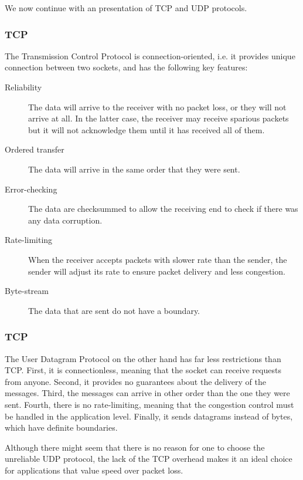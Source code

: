 
We now continue with an presentation of TCP and UDP protocols.

\subsubsection{TCP}

The Transmission Control Protocol is connection-oriented, i.e. it provides 
unique connection between two sockets, and has the following key features:

\begin{description}
	\item[Reliability] The data will arrive to the receiver with no packet 
		loss, or they will not arrive at all. In the latter case, the 
		receiver may receive sparious packets but it will not 
		acknowledge them until it has received all of them.
	\item[Ordered transfer] The data will arrive in the same order that 
		they were sent.
	\item[Error-checking] The data are checksummed to allow the receiving 
		end to check if there was any data corruption.
	\item[Rate-limiting] When the receiver accepts packets with slower rate 
		than the sender, the sender will adjust its rate to ensure 
		packet delivery and less congestion.
	\item[Byte-stream] The data that are sent do not have a boundary.
\end{description}

\subsubsection{TCP}

The User Datagram Protocol on the other hand has far less restrictions than 
TCP. First, it is connectionless, meaning that the socket can receive requests 
from anyone. Second, it provides no guarantees about the delivery of the 
messages. Third, the messages can arrive in other order than the one they were 
sent. Fourth, there is no rate-limiting, meaning that the congestion control 
must be handled in the application level. Finally, it sends datagrams instead 
of bytes, which have definite boundaries.

Although there might seem that there is no reason for one to choose the 
unreliable UDP protocol, the lack of the TCP overhead makes it an ideal choice 
for applications that value speed over packet loss.

